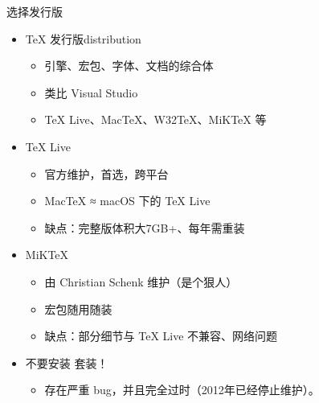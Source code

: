 \begin{frame}{选择发行版}
    \begin{itemize}
    \item \TeX{} 发行版distribution

        \begin{itemize}
        \item 引擎、宏包、字体、文档的综合体
        \item 类比 Visual Studio
        \item \TeX{} Live、Mac\TeX{}、W32\TeX{}、MiK\TeX{} 等
        \end{itemize} \pause

    \item \TeX{} Live 

        \begin{itemize}
        \item 官方维护，首选，跨平台
        \item Mac\TeX{} ≈ macOS 下的 \TeX{} Live
        \item 缺点：完整版体积大7GB+、每年需重装
        \end{itemize}

    \item MiK\TeX{} 

        \begin{itemize}
        \item 由 Christian Schenk 维护（是个狠人）
        \item 宏包随用随装
        \item 缺点：部分细节与 \TeX{} Live 不兼容、网络问题
        \end{itemize} \pause

    \item \alert{不要安装 \CTeX{} 套装！}

        \begin{itemize}
        \item \alert{存在严重 bug，并且完全过时（2012年已经停止维护）。}
        \end{itemize}
    \end{itemize}
\end{frame}

